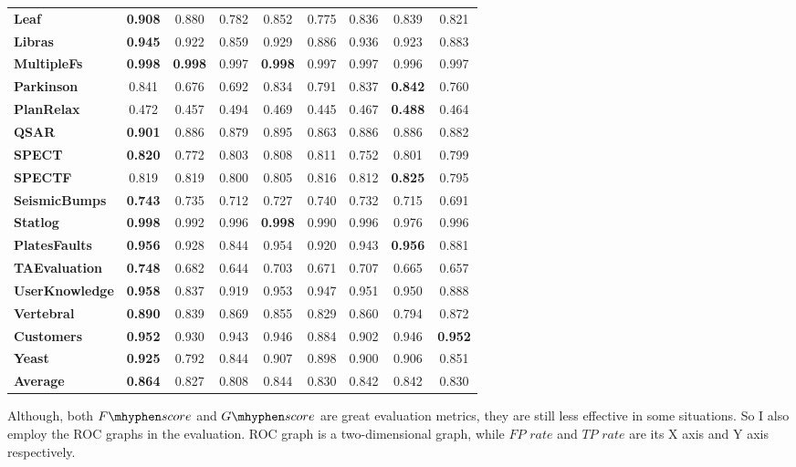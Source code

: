 \documentclass{iitthesis}
\newcommand\fscore{\mathop{F\mhyphen score}}
\newcommand\gscore{\mathop{G\mhyphen score}}
\begin{document}
\begin{table}[t]
\begin{center}
{\begin{tabular}{lcccccccc}
\textbf{Leaf} & \textbf{0.908} & 0.880 & 0.782 & 0.852 & 0.775 & 0.836 & 0.839 & 0.821 \\ 
\textbf{Libras} & \textbf{0.945} & 0.922 & 0.859 & 0.929 & 0.886 & 0.936 & 0.923 & 0.883 \\ 
\textbf{MultipleFs} & \textbf{0.998} & \textbf{0.998} & 0.997 & \textbf{0.998} & 0.997 & 0.997 & 0.996 & 0.997 \\ 
\textbf{Parkinson} & 0.841 & 0.676 & 0.692 & 0.834 & 0.791 & 0.837 & \textbf{0.842} & 0.760 \\ 
\textbf{PlanRelax} & 0.472 & 0.457 & 0.494 & 0.469 & 0.445 & 0.467 & \textbf{0.488} & 0.464 \\ 
\textbf{QSAR} & \textbf{0.901} & 0.886 & 0.879 & 0.895 & 0.863 & 0.886 & 0.886 & 0.882 \\ 
\textbf{SPECT} & \textbf{0.820} & 0.772 & 0.803 & 0.808 & 0.811 & 0.752 & 0.801 & 0.799 \\ 
\textbf{SPECTF} & 0.819 & 0.819 & 0.800 & 0.805 & 0.816 & 0.812 & \textbf{0.825} & 0.795 \\ 
\textbf{SeismicBumps} & \textbf{0.743} & 0.735 & 0.712 & 0.727 & 0.740 & 0.732 & 0.715 & 0.691 \\ 
\textbf{Statlog} & \textbf{0.998} & 0.992 & 0.996 & \textbf{0.998} & 0.990 & 0.996 & 0.976 & 0.996 \\ 
\textbf{PlatesFaults} & \textbf{0.956} & 0.928 & 0.844 & 0.954 & 0.920 & 0.943 & \textbf{0.956} & 0.881 \\ 
\textbf{TAEvaluation} & \textbf{0.748} & 0.682 & 0.644 & 0.703 & 0.671 & 0.707 & 0.665 & 0.657 \\ 
\textbf{UserKnowledge} & \textbf{0.958} & 0.837 & 0.919 & 0.953 & 0.947 & 0.951 & 0.950 & 0.888 \\ 
\textbf{Vertebral} & \textbf{0.890} & 0.839 & 0.869 & 0.855 & 0.829 & 0.860 & 0.794 & 0.872 \\ 
\textbf{Customers} & \textbf{0.952} & 0.930 & 0.943 & 0.946 & 0.884 & 0.902 & 0.946 & \textbf{0.952} \\ 
\textbf{Yeast} & \textbf{0.925} & 0.792 & 0.844 & 0.907 & 0.898 & 0.900 & 0.906 & 0.851 \\
\textbf{Average} & \textbf{0.864} & 0.827 & 0.808 & 0.844 & 0.830 & 0.842 & 0.842 & 0.830 \\
\hline
\end{tabular}
}
\end{center}
\label{tab: results_real_data_per_file}
\end{table} 

Although, both $\fscore$ and $\gscore$ are great evaluation metrics, they are still less effective in some situations. So I also employ the ROC graphs \cite{fawcett2004roc}\cite{fawcett2006introduction}\cite{mohri2005confidence} in the evaluation. ROC graph is a two-dimensional graph, while $FP$ $rate$ and $TP$ $rate$ are its X axis and Y axis respectively. 
\end{document}
